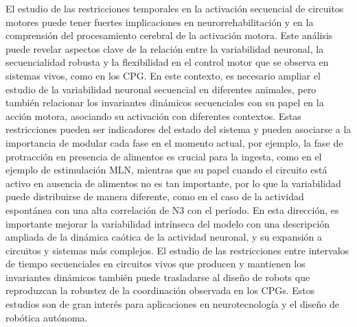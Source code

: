 El estudio de las restricciones temporales en la activación secuencial de circuitos motores puede tener fuertes implicaciones en neurorrehabilitación y en la comprensión del procesamiento cerebral de la activación motora. Este análisis puede revelar aspectos clave de la relación entre la variabilidad neuronal, la secuencialidad robusta y la flexibilidad en el control motor que se observa en sistemas vivos, como en los CPG. En este contexto, es necesario ampliar el estudio de la variabilidad neuronal secuencial en diferentes animales, pero también relacionar los invariantes dinámicos secuenciales con su papel en la acción motora, asociando su activación con diferentes contextos. Estas restricciones pueden ser indicadores del estado del sistema y pueden asociarse a la importancia de modular cada fase en el momento actual, por ejemplo, la fase de protracción en presencia de alimentos es crucial para la ingesta, como en el ejemplo de estimulación MLN, mientras que su papel cuando el circuito está activo en ausencia de alimentos no es tan importante, por lo que la variabilidad puede distribuirse de manera diferente, como en el caso de la actividad espontánea con una alta correlación de N3 con el período. En esta dirección, es importante mejorar la variabilidad intrínseca del modelo con una descripción ampliada de la dinámica caótica de la actividad neuronal, y su expansión a circuitos y sistemas más complejos. El estudio de las restricciones entre intervalos de tiempo secuenciales en circuitos vivos que producen y mantienen los invariantes dinámicos también puede trasladarse al diseño de robots que reproduzcan la robustez de la coordinación observada en los CPGs. Estos estudios son de gran interés para aplicaciones en neurotecnología y el diseño de robótica autónoma.

